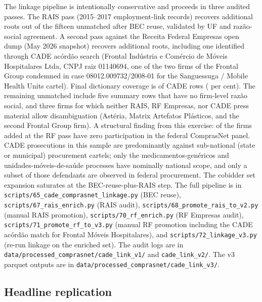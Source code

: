 The linkage pipeline is intentionally conservative and proceeds in
three audited passes. The RAIS pass (2015--2017 employment-link
records) recovers \valFedCadeEnrichedRAIS{} additional roots out of
the fifteen unmatched after BEC reuse, validated by UF and
razão-social agreement. A second pass against the Receita Federal
Empresas open dump (May 2026 snapshot) recovers
\valFedCadeEnrichedRF{} additional roots, including one identified
through CADE acórdão search (Frontal Indústria e Comércio de
Móveis Hospitalares Ltda, CNPJ raiz 01140694, one of the two firms
of the Frontal Group condemned in case 08012.009732/2008-01 for the
Sanguessuga / Mobile Health Units cartel). Final dictionary
coverage is \valFedCadeEnrichedTotal{} of \valFedCadeRows{} CADE
rows (\valFedCadeCoverage{} per cent). The remaining unmatched
include five summary rows that have no firm-level razão social, and
three firms for which neither RAIS, RF Empresas, nor CADE press
material allow disambiguation (Astéria, Matrix Artefatos Plásticos,
and the second Frontal Group firm). A structural finding from this
exercise: \valFedCadeEnrichedRF{} of the firms added at the RF pass
have zero participation in the federal ComprasNet panel. CADE
prosecutions in this sample are predominantly against
sub-national (state or municipal) procurement cartels; only the
medicamentos-genéricos and unidades-móveis-de-saúde processes
have nominally national scope, and only a subset of those
defendants are observed in federal procurement. The cobidder set
expansion saturates at the BEC-reuse-plus-RAIS step. The full
pipeline is in
\texttt{scripts/65\_cade\_comprasnet\_linkage.py} (BEC reuse),
\texttt{scripts/67\_rais\_enrich.py} (RAIS audit),
\texttt{scripts/68\_promote\_rais\_to\_v2.py} (manual RAIS
promotion),
\texttt{scripts/70\_rf\_enrich.py} (RF Empresas audit),
\texttt{scripts/71\_promote\_rf\_to\_v3.py} (manual RF promotion
including the CADE acórdão match for Frontal Móveis Hospitalares),
and \texttt{scripts/72\_linkage\_v3.py} (re-run linkage on the
enriched set). The audit logs are in
\texttt{data/processed\_comprasnet/cade\_link\_v1/} and
\texttt{cade\_link\_v2/}.
The v3 parquet outputs are in
\texttt{data/processed\_comprasnet/cade\_link\_v3/}.

\subsection{Headline replication}
\label{app:comprasnet_replication}

